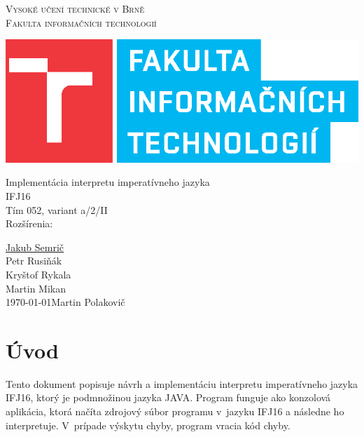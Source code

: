 \documentclass[11pt,a4paper]{article}
\begin{document}
\begin{titlepage}
\begin{center}
\textsc{\Huge Vysoké učení technické v Brně\\ \medskip
\huge Fakulta informačních technologií}\\[30mm]
	
\begin{center}
\scalebox{1} {\includegraphics{fit_logo.eps}}
\end{center}

\Huge{Implementácia interpretu imperatívneho jazyka}\\[4mm]
\Huge{IFJ16}\\[2mm]
\LARGE{Tím 052, variant a/2/II}\\
\LARGE{Rozšírenia: }\\


\begin{flushright}
\noindent \underline{Jakub Semrič}\\
Petr Rusiňák\\
Kryštof Rykala\\
Martin Mikan\\
\today \hfill         Martin Polakovič \newpage
\end{flushright}

\end{center}

\pagebreak
\thispagestyle{empty}
\tableofcontents
\pagebreak

\end{titlepage}
\newpage

\section{Úvod}

Tento dokument popisuje návrh a implementáciu interpretu imperatívneho jazyka IFJ16, ktorý je podmnožinou jazyka JAVA.
Program funguje ako konzolová aplikácia, ktorá načíta zdrojový súbor programu v~jazyku IFJ16 a následne ho interpretuje. V~prípade výskytu chyby, program vracia kód chyby.
\end{document}
